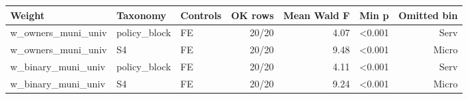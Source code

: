 \begin{tabular}{lllrrrr}
\toprule
Weight & Taxonomy & Controls & OK rows & Mean Wald F & Min p & Omitted bin \\
\midrule
w\_owners\_muni\_univ & policy\_block & FE & 20/20 & 4.07 & <0.001 & Serv \\
w\_owners\_muni\_univ & S4 & FE & 20/20 & 9.48 & <0.001 & Micro \\
w\_binary\_muni\_univ & policy\_block & FE & 20/20 & 4.11 & <0.001 & Serv \\
w\_binary\_muni\_univ & S4 & FE & 20/20 & 9.24 & <0.001 & Micro \\
\bottomrule
\end{tabular}
